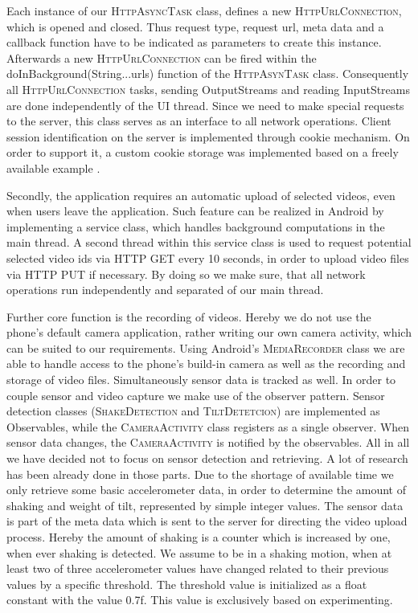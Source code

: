 \documentclass[conference]{IEEEtran}
\begin{document}
Each instance of our \textsc{HttpAsyncTask} class, defines a new \textsc{HttpUrlConnection}, which is opened and closed.
Thus request type, request url, meta data and a callback function have to be indicated as parameters to create this instance.
Afterwards a new \textsc{HttpUrlConnection} can be fired within the doInBackground(String...urls) function of the \textsc{HttpAsynTask} class. Consequently all \textsc{HttpUrlConnection} tasks,
sending OutputStreams and reading InputStreams are done independently of the UI thread.
Since we need to make special requests to the server, this class serves as an interface to all network operations.
Client session identification on the server is implemented through cookie mechanism. 
On order to support it, a custom cookie storage was implemented based on a freely available example \cite{so_java_cookies}.

Secondly, the application requires an automatic upload of selected videos, even when users leave the application.
Such feature can be realized in Android by implementing a service class, which handles background computations in the main thread. 
A second thread within this service class is used to request potential selected video ids via HTTP GET every 10 seconds,
in order to upload video files via HTTP PUT if necessary.
By doing so we make sure, that all network operations run independently and separated of our main thread.

Further core function is the recording of videos. Hereby we do not use the phone's default camera application,
rather writing our own camera activity, which can be suited to our requirements.
Using Android's \textsc{MediaRecorder} class we are able to handle access to the phone's build-in camera
as well as the recording and storage of video files.
Simultaneously sensor data is tracked as well.
In order to couple sensor and video capture we make use of the observer pattern.
Sensor detection classes (\textsc{ShakeDetection} and T\textsc{iltDetetcion}) are implemented as Observables,
while the \textsc{CameraActivity} class registers as a single observer. 
When sensor data changes, the \textsc{CameraActivity} is notified by the observables.
All in all we have decided not to focus on sensor detection and retrieving.
A lot of research has been already done in those parts. Due to the shortage of available time we only retrieve 
some basic accelerometer data, in order to determine the amount of shaking and weight of tilt, 
represented by simple integer values.
The sensor data is part of the meta data which is sent to the server for directing the video upload process.
Hereby the amount of shaking is a counter which is increased by one, when ever shaking is detected.
We assume to be in a shaking motion, when at least two of three accelerometer values have changed related
to their previous values by a specific threshold.
The threshold value is initialized as a float constant with the value 0.7f. This value is exclusively based on experimenting.
\end{document}
